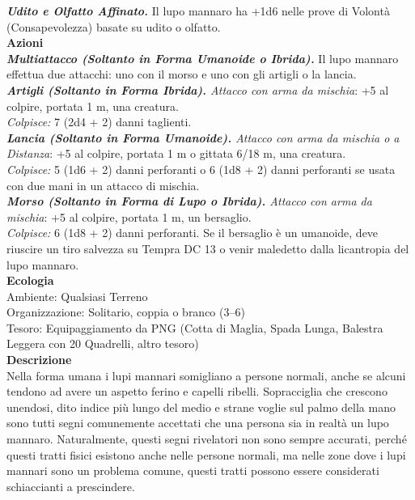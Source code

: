 \begin{multicols}{2}
\emph{\textbf{Udito e Olfatto Affinato.}} Il lupo mannaro ha +1d6 nelle prove di Volontà (Consapevolezza) basate su udito o olfatto.\\
\smallskip\textbf{Azioni}\\

\emph{\textbf{Multiattacco (Soltanto in Forma Umanoide o Ibrida).}} Il lupo mannaro effettua due attacchi: uno con il morso e uno con gli artigli o la lancia.\\
\emph{\textbf{Artigli (Soltanto in Forma Ibrida).} Attacco con arma da mischia}: +5 al colpire, portata 1 m, una creatura.\\
\emph{Colpisce:} 7 (2d4 + 2) danni taglienti.\\

\emph{\textbf{Lancia (Soltanto in Forma Umanoide).} Attacco con arma da mischia o a Distanza}: +5 al colpire, portata 1 m o gittata 6/18 m, una creatura.\\

\emph{Colpisce:} 5 (1d6 + 2) danni perforanti o 6 (1d8 + 2) danni perforanti se usata con due mani in un attacco di mischia.\\

\emph{\textbf{Morso (Soltanto in Forma di Lupo o Ibrida).} Attacco con arma da mischia}: +5 al colpire, portata 1 m, un bersaglio.\\
\emph{Colpisce:} 6 (1d8 + 2) danni perforanti. Se il bersaglio è un umanoide, deve riuscire un tiro salvezza su Tempra DC  13 o venir maledetto dalla licantropia del lupo mannaro.\\
\textbf{Ecologia}\\
Ambiente: Qualsiasi Terreno\\
Organizzazione: Solitario, coppia o branco (3–6)\\
Tesoro: Equipaggiamento da PNG (Cotta di Maglia, Spada Lunga, Balestra Leggera con 20 Quadrelli, altro tesoro)\\
\textbf{Descrizione}\\
Nella forma umana i lupi mannari somigliano a persone normali, anche se alcuni tendono ad avere un aspetto ferino e capelli ribelli. Sopracciglia che crescono unendosi, dito indice più lungo del medio e strane voglie sul palmo della mano sono tutti segni comunemente accettati che una persona sia in realtà un lupo mannaro. Naturalmente, questi segni rivelatori non sono sempre accurati, perché questi tratti fisici esistono anche nelle persone normali, ma nelle zone dove i lupi mannari sono un problema comune, questi tratti possono essere considerati schiaccianti a prescindere.\\


\end{multicols}
